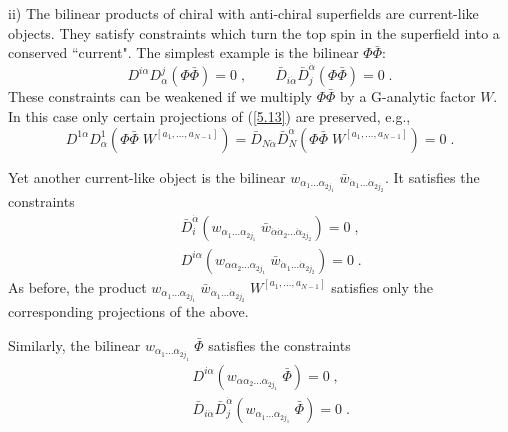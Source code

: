 \documentclass[a4paper,12pt]{article}
\begin{document}
ii) The bilinear products of chiral with anti-chiral 
superfields are current-like objects.
They satisfy constraints which turn  the top 
spin in the superfield into a conserved ``current". 
The simplest example is the bilinear $\Phi\bar \Phi$: 
\begin{equation}\label{5.13}
  D^{i\alpha}D^j_\alpha(\Phi\bar \Phi) = 0\;,\qquad \bar D_{i\dot\alpha} \bar 
D_j^{\dot\alpha}(\Phi\bar \Phi) = 0\;. 
\end{equation}
These constraints can be weakened if we multiply $\Phi\bar \Phi$ 
by a G-analytic factor $W$. In this case only certain projections 
of (\ref{5.13}) are preserved, e.g., 
\begin{equation}\label{5.14}
  D^{1\alpha}D^1_\alpha(\Phi\bar \Phi\;W^{[a_1,\ldots,a_{N-1}]}) = 
\bar D_{N\dot\alpha} \bar 
D_N ^{\dot\alpha}(\Phi\bar \Phi\;W^{[a_1,\ldots,a_{N-1}]}) = 0\;. 
\end{equation}

Yet another current-like object is the bilinear 
$w_{\alpha_1\ldots\alpha_{2j_1}}\;\bar 
w_{\dot\alpha_1\ldots\dot\alpha_{2j_2}}$. It satisfies the 
constraints
\begin{eqnarray}
  &&\bar D^{\dot\alpha}_i 
(w_{\alpha_1\ldots\alpha_{2j_1}}\;\bar 
w_{\dot\alpha\dot\alpha_2\ldots\dot\alpha_{2j_2}}) = 0\;, 
\label{5.15}\\ 
  && D^{i\alpha}(w_{\alpha\alpha_2\ldots\alpha_{2j_1}}\;\bar 
w_{\dot\alpha_1\ldots\dot\alpha_{2j_2}}) = 0\;. 
 \label{5.16}
\end{eqnarray} 
As before, the product $w_{\alpha_1\ldots\alpha_{2j_1}}\;\bar 
w_{\dot\alpha_1\ldots\dot\alpha_{2j_2}}\;W^{[a_1,\ldots,a_{N-1}]}$ 
satisfies only the corresponding projections of the above.

Similarly, the bilinear $w_{\alpha_1\ldots\alpha_{2j_1}}\;\bar\Phi$ 
satisfies the constraints 
\begin{eqnarray}
  && D^{i\alpha}(w_{\alpha\alpha_2\ldots\alpha_{2j_1}}\;\bar 
\Phi)=0\;, \label{5.17}\\ 
  &&\bar D_{i\dot\alpha} \bar 
D_j^{\dot\alpha}(w_{\alpha_1\ldots\alpha_{2j_1}}\;\bar \Phi)=0\;. 
\label{5.18} 
\end{eqnarray}
\end{document}
